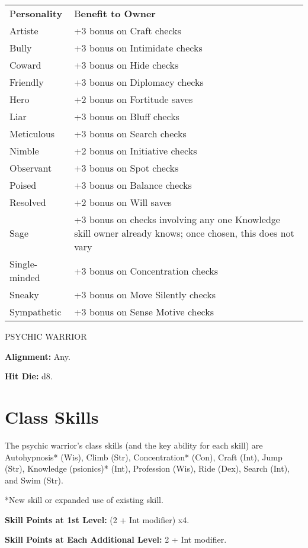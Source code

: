 \documentclass{article}
\begin{document}
\vspace{12pt}
\begin{tabular}{|>{\raggedright}p{62pt}|>{\raggedright}p{180pt}|}
\hline
\multicolumn{2}{|p{242pt}|}{P\textbf{sicrystal Personalities}}\tabularnewline
\hline
P\textbf{ersonality} & B\textbf{enefit to Owner}\tabularnewline
\hline
Artiste & +3 bonus on Craft checks\tabularnewline
\hline
Bully & +3 bonus on Intimidate checks\tabularnewline
\hline
Coward & +3 bonus on Hide checks\tabularnewline
\hline
Friendly & +3 bonus on Diplomacy checks\tabularnewline
\hline
Hero & +2 bonus on Fortitude saves\tabularnewline
\hline
Liar & +3 bonus on Bluff checks\tabularnewline
\hline
Meticulous & +3 bonus on Search checks\tabularnewline
\hline
Nimble & +2 bonus on Initiative checks\tabularnewline
\hline
Observant & +3 bonus on Spot checks\tabularnewline
\hline
Poised & +3 bonus on Balance checks\tabularnewline
\hline
Resolved & +2 bonus on Will saves\tabularnewline
\hline
Sage & +3 bonus on checks involving any one Knowledge skill owner already knows; 
once chosen, this does not vary\tabularnewline
\hline
Single-minded & +3 bonus on Concentration checks\tabularnewline
\hline
Sneaky & +3 bonus on Move Silently checks\tabularnewline
\hline
Sympathetic & +3 bonus on Sense Motive checks\tabularnewline
\hline
\end{tabular}

\vspace{12pt}
{\LARGE{}PSYCHIC WARRIOR}

\textbf{Alignment:} Any.

\textbf{Hit Die:} d8.

\vspace{12pt}
\section*{\textbf{Class Skills}}

The psychic warrior's class skills (and the key ability for each skill) are Autohypnosis* 
(Wis), Climb (Str), Concentration* (Con), Craft (Int), Jump (Str), Knowledge (psionics)* 
(Int), Profession (Wis), Ride (Dex), Search (Int), and Swim (Str).

*New skill or expanded use of existing skill.

\textbf{Skill Points at 1st Level:} (2 + Int modifier) x4.

\textbf{Skill Points at Each Additional Level:} 2 + Int modifier.
\end{document}
